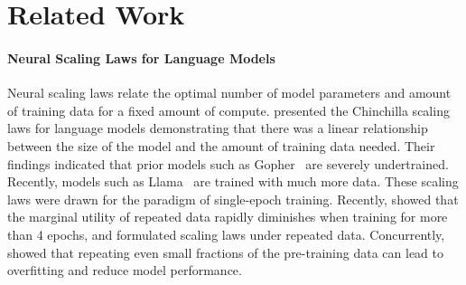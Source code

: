 \section{Related Work}
\paragraph{Neural Scaling Laws for Language Models}
Neural scaling laws relate the optimal number of model parameters and amount of training data for a fixed amount of compute.  \citet{hoffmann2022training} presented the Chinchilla scaling laws for language models demonstrating that there was a linear relationship between the size of the model and the amount of training data needed. Their findings indicated that prior models such as Gopher~\citep{rae2021scaling} are severely undertrained. Recently, models such as Llama~\citep{touvron2023llama} are trained with much more data.  These scaling laws were drawn for the paradigm of single-epoch training.  Recently, \citet{muennighoff2023scaling} showed that
the marginal utility of repeated data rapidly diminishes when training for more than 4 epochs, and formulated scaling laws under repeated data.
Concurrently, \citet{xue2023repeat} showed that repeating even small fractions of the pre-training data can lead to overfitting and reduce model performance.

